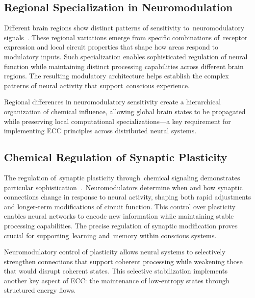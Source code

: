 \subsection*{Regional Specialization in Neuromodulation~}

Different brain regions show distinct patterns of sensitivity to~neuromodulatory signals~\cite{Parr2017, Magistretti2015}. These regional variations emerge from specific combinations of~receptor expression and local circuit properties that shape how areas respond to modulatory inputs. Such specialization enables sophisticated regulation of neural function while maintaining distinct processing capabilities across different brain regions. The resulting modulatory architecture helps establish the complex patterns of neural activity that support~conscious experience.

Regional differences in neuromodulatory sensitivity create a hierarchical organization of chemical influence, allowing global brain states to be propagated while preserving local computational specializations—a key requirement for implementing ECC principles across distributed neural systems.

\subsection*{Chemical Regulation of Synaptic Plasticity~}

The regulation of~synaptic plasticity through~chemical signaling demonstrates particular sophistication~\cite{Froemke2015, gershman2023molecular}.~Neuromodulators determine when and how synaptic connections change in response to neural activity, shaping both rapid adjustments and longer-term modifications of circuit function. This control over plasticity enables neural networks to encode new information while maintaining stable processing capabilities. The precise regulation of synaptic modification proves crucial for supporting~learning and~memory within conscious systems.

Neuromodulatory control of plasticity allows neural systems to selectively strengthen connections that support coherent processing while weakening those that would disrupt coherent states. This selective stabilization implements another key aspect of ECC: the maintenance of low-entropy states through structured energy flows.

